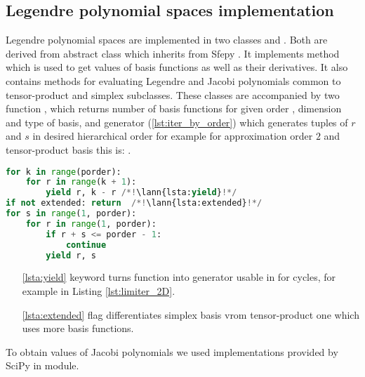 \subsection{Legendre polynomial spaces implementation}
Legendre polynomial spaces are implemented in two classes 
 and 
. Both are derived from abstract class 
 which inherits from Sfepy 
. It implements method  which is used to 
get values of basis functions as well as their derivatives. It also contains 
methods for evaluating Legendre and Jacobi polynomials common to tensor-product 
and simplex subclasses. These classes are accompanied by two function 
, which returns number of basis functions for given order , 
dimension and type of basis, and generator  
(\ref{lst:iter_by_order}) which generates tuples of $r$ and $s$ in desired hierarchical 
order for example for approximation order $2$ and tensor-product basis this is: 
. 
\setcounter{lstannotation}{0}
\begin{lstlisting}[language=Python, caption= Iteration over $r$ and $s$ indicies of basis 
functions \label{lst:iter_by_order}]
for k in range(porder):
    for r in range(k + 1):
        yield r, k - r /*!\lann{lsta:yield}!*/
if not extended: return  /*!\lann{lsta:extended}!*/
for s in range(1, porder):
    for r in range(1, porder):
        if r + s <= porder - 1:
            continue
        yield r, s
\end{lstlisting}
\begin{itemize}
    \item[\ref{lsta:yield}]  keyword turns function into generator usable 
    in for cycles, for example in Listing \ref{lst:limiter_2D}.
    \item[\ref{lsta:extended}]  flag differentiates simplex basis vrom 
    tensor-product one which uses more basis functions.
\end{itemize}
To obtain values of Jacobi polynomials we used implementations provided by SciPy in 
 module.

